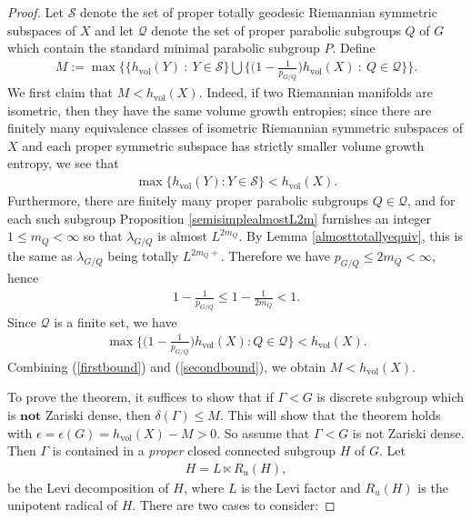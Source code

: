 \documentclass[psamsfonts]{amsart}
\theoremstyle{definition}
\theoremstyle{remark}
\numberwithin{equation}{section}
\begin{document}
\begin{proof}
Let $\mathcal{S}$ denote the set of proper totally geodesic Riemannian symmetric subspaces of $X$ and let $\mathcal{Q}$ denote the set of proper parabolic subgroups $Q$ of $G$ which contain the standard minimal parabolic subgroup $P$. Define
\begin{align*}
M := \max \bigg \{ \Big \{h_{\mathrm{vol}}(Y) \ : \ Y \in \mathcal{S} \Big \} \bigcup \Big \{ \Big(1 - \frac{1}{p_{G/Q}} \Big)h_{\mathrm{vol}}(X) \ : \ Q \in \mathcal{Q} \Big \} \bigg \}.
\end{align*}
We first claim that $M < h_{\mathrm{vol}}(X)$. Indeed, if two Riemannian manifolds are isometric, then they have the same volume growth entropies; since there are finitely many equivalence classes of isometric Riemannian symmetric subspaces of $X$ and each proper symmetric subspace has strictly smaller volume growth entropy, we see that 
\begin{align}
\label{firstbound}
\max \{h_{\mathrm{vol}}(Y) : Y \in \mathcal{S}\} < h_{\mathrm{vol}}(X).
\end{align}
Furthermore, there are finitely many proper parabolic subgroups $Q \in \mathcal{Q}$, and for each such subgroup Proposition \ref{semisimplealmostL2m} furnishes an integer $1 \leq m_{Q} < \infty$ so that $\lambda_{G/Q}$ is almost $L^{2m_{Q}}$. By Lemma \ref{almosttotallyequiv}, this is the same as $\lambda_{G/Q}$ being totally $L^{2m_{Q}+}$. Therefore we have $p_{G/Q} \leq 2m_{Q} < \infty$, hence
\begin{align*}
1 - \frac{1}{p_{G/Q}} \leq 1 - \frac{1}{2m_{Q}} < 1.
\end{align*}
Since $\mathcal{Q}$ is a finite set, we have
\begin{align}
\label{secondbound}
\max \bigg \{ \Big(1 - \frac{1}{p_{G/Q}} \Big) h_{\mathrm{vol}}(X) : Q \in \mathcal{Q} \bigg \} < h_{\mathrm{vol}}(X).
\end{align}
Combining (\ref{firstbound}) and (\ref{secondbound}), we obtain $M < h_{\mathrm{vol}}(X)$. 
\par 
To prove the theorem, it suffices to show that if $\Gamma < G$ is discrete subgroup which is $\textbf{not}$ Zariski dense, then $\delta(\Gamma) \leq M$. This will show that the theorem holds with $\epsilon = \epsilon(G) = h_{\mathrm{vol}}(X) - M > 0$. So assume that $\Gamma < G$ is not Zariski dense. Then $\Gamma$ is contained in a \emph{proper} closed connected subgroup $H$ of $G$. Let
\begin{align*}
H = L \ltimes R_{u}(H),
\end{align*} be the Levi decomposition of $H$, where $L$ is the Levi factor and $R_{u}(H)$ is the unipotent radical of $H$. There are two cases to consider:

\end{proof}
\end{document}
